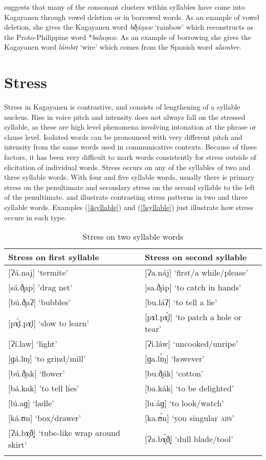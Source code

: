 \citet[11]{harmon1977} suggests that many of the consonant clusters within syllables have come into Kagayanen through vowel deletion or in borrowed words. As an example of vowel deletion, she gives the Kagayanen word \textit{bð̞áŋaw} ‘rainbow’ which reconstructs as the Proto-Philippine word *\textit{balaŋaw}. As an example of borrowing she gives the Kagayanen word \textit{lámbɾɪ} ‘wire’ which comes from the Spanish word \textit{alambre.} 

\section{Stress} 
\label{bkm:Ref360478190}
Stress in Kagayanen is contrastive, and consists of lengthening of a syllable nucleus. Rise in voice pitch and intensity does not always fall on the stressed syllable, as these are high level phenomena involving intonation at the phrase or clause level. Isolated words can be pronounced with very different pitch and intensity from the same words used in communicative contexts. Because of these factors, it has been very difficult to mark words consistently for stress outside of elicitation of individual words. Stress occurs on any of the syllables of two and three syllable words. With four and five syllable words, usually there is primary stress on the penultimate and secondary stress on the second syllable to the left of the penultimate.
 and  illustrate contrasting stress patterns in two and three syllable words. Examples (\ref{4syllable}) and (\ref{5syllable}) just illustrate how stress occurs in each type.

\begin{table}
\caption{Stress on two syllable words}
\label{tab2.10}
\begin{tabularx}{\textwidth}{Xl}
\lsptoprule
Stress on first syllable & Stress on second syllable \\
\midrule
{}[Ɂá.naj] ‘termite’ & [Ɂa.náj] ‘first/a while/please’ \\
{}[sá.ð̞̞ap] ’drag net’ & [sa.ð̞áp] ‘to catch in hands’ \\
{}[bú.ð̞aʔ] ‘bubbles’ & [bu.láʔ] ‘to tell a lie’ \\
{}[pɤ̞́l.pɤ̞l] ‘slow to learn’ & [pɤl.pɤ̞́l] ‘to patch a hole or tear’ \\
{}[Ɂí.law] ‘light’ & [Ɂi.láw] ‘uncooked/unripe’ \\
{}[ɡá.lɪŋ] ‘to grind/mill’ & [ɡa.lɪ́ŋ] ‘however’ \\
{}[bú.ð̞ak] ‘flower’ & [bu.ð̞ák] ‘cotton’ \\
{}[bá.kak] ’to tell lies’ & [ba.kák] ‘to be delighted’ \\
{}[lú.aɡ] ‘ladle’ & [lu.áɡ] ‘to look/watch’ \\
{}[ká.ʊn] ‘box/drawer’ & [ka.ʊ́n] ‘you singular \textsc{abs}’ \\
{}[Ɂá.bɤ̞ð̞] ‘tube-like wrap around skirt’ & [Ɂa.bɤ̞́ð̞] ‘dull blade/tool’ \\
\lspbottomrule
\end{tabularx}
\end{table}

